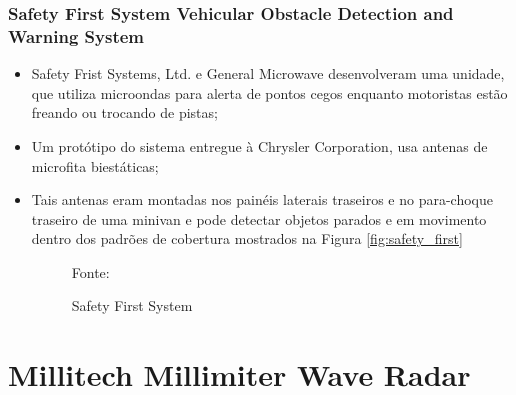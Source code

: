\documentclass[xcolor=dvipsnames, aspectratio=169]{beamer}
\begin{document}
\begin{frame}
\frametitle{Safety First System Vehicular Obstacle Detection and Warning System}
	\begin{itemize}
		\item Safety Frist Systems, Ltd. e General Microwave desenvolveram uma unidade, que utiliza microondas para alerta de pontos cegos enquanto motoristas estão freando ou trocando de pistas;
		\item Um protótipo do sistema entregue à Chrysler Corporation, usa antenas de microfita biestáticas;
        \item Tais antenas eram montadas nos painéis laterais traseiros e no para-choque traseiro de uma minivan e pode detectar objetos parados e em movimento dentro dos padrões de cobertura mostrados na Figura \autoref{fig:safety_first}
        \begin{figure}
            \centering
            {Fonte: \cite{everett1995sensors}}
            \caption{Safety First System}
            \label{fig:safety_first}
        \end{figure}

	\end{itemize}
\end{frame}


\section[Millitech Millimiter Wave Radar]{Millitech Millimiter Wave Radar} 
\end{document}
